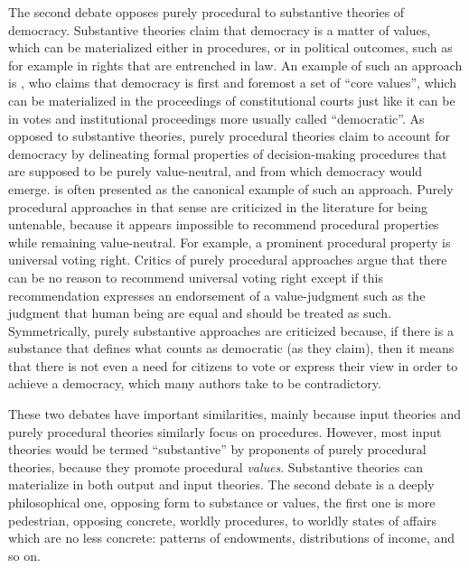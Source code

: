 \documentclass[preprint,11pt]{elsarticle}
\begin{document}
The second debate opposes purely procedural to substantive theories of democracy. Substantive theories claim that democracy is a matter of values, which can be materialized either in procedures, or in political outcomes, such as for example in rights that are entrenched in law. An example of such an approach is \cite{brettschneider_value_2006}, who claims that democracy is first and foremost a set of ``core values'', which can be materialized in the proceedings of constitutional courts just like it can be in votes and institutional proceedings more usually called ``democratic''. As opposed to substantive theories, purely procedural theories claim to account for democracy by delineating formal properties of decision-making procedures that are supposed to be purely value-neutral, and from which democracy would emerge. \cite{habermas_faktizitat_1992} is often presented as the canonical example of such an approach. Purely procedural approaches in that sense are criticized in the literature for being untenable, because it appears impossible to recommend procedural properties while remaining value-neutral. For example, a prominent procedural property is universal voting right. Critics of purely procedural approaches argue that there can be no reason to recommend universal voting right except if this recommendation expresses an endorsement of a value-judgment such as the judgment that human being are equal and should be treated as such. Symmetrically, purely substantive approaches are criticized because, if there is a substance that defines what counts as democratic (as they claim), then it means that there is not even a need for citizens to vote or express their view in order to achieve a democracy, which many authors take to be contradictory.


These two debates have important similarities, mainly because input theories and purely procedural theories similarly focus on procedures. However, most input theories would be termed ``substantive'' by proponents of purely procedural theories, because they promote procedural \emph{values}. Substantive theories can materialize in both output and input theories. The second debate is a deeply philosophical one, opposing form to substance or values, the first one is more pedestrian, opposing concrete, worldly procedures, to worldly states of affairs which are no less concrete: patterns of endowments, distributions of income, and so on.
\end{document}
